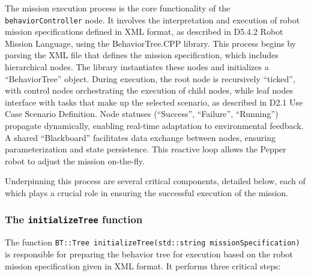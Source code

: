 \documentclass{CSSRforAfrica}
\begin{document}
The mission execution process is the core functionality of the \texttt{\small behaviorController} node. It involves the interpretation and execution of robot mission specifications defined in XML format, as described in \textnormal{D5.4.2 Robot Mission Language}, using the BehaviorTree.CPP library. This process begins by parsing the XML file that defines the mission specification, which includes hierarchical nodes. The library instantiates these nodes and initializes a ``BehaviorTree'' object. During execution, the root node is recursively ``ticked'', with control nodes orchestrating the execution of child nodes, while leaf nodes interface with tasks that make up the selected scenario, as described in \textnormal{D2.1 Use Case Scenario Definition}. Node statuses (``Success'', ``Failure'', ``Running'') propagate dynamically, enabling real-time adaptation to environmental feedback. A shared \textnormal{``Blackboard''} facilitates data exchange between nodes, ensuring parameterization and state persistence. This reactive loop allows the Pepper robot to adjust the mission on-the-fly.

Underpinning this process are several critical components, detailed below, each of which plays a crucial role in ensuring the successful execution of the mission.
\subsubsection{The \texttt{\small initializeTree} function}

The function \texttt{\small BT::Tree initializeTree(std::string missionSpecification)} is responsible for preparing the behavior tree for execution based on the robot mission specification given in XML format. It performs three critical steps:
\end{document}
